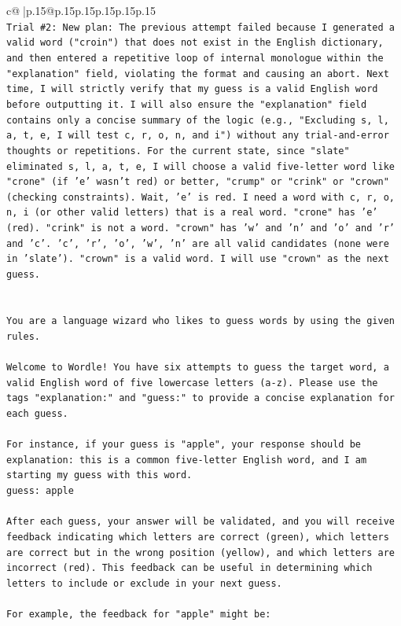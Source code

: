 \documentclass{article}
\begin{document}
{\begin{supertabular}{c@{$\;$}|p{.15\linewidth}@{}p{.15\linewidth}p{.15\linewidth}p{.15\linewidth}p{.15\linewidth}p{.15\linewidth}}
{{{\\ 
\texttt{Trial \#2: New plan: The previous attempt failed because I generated a valid word ("croin") that does not exist in the English dictionary, and then entered a repetitive loop of internal monologue within the "explanation" field, violating the format and causing an abort. Next time, I will strictly verify that my guess is a valid English word before outputting it. I will also ensure the "explanation" field contains only a concise summary of the logic (e.g., "Excluding s, l, a, t, e, I will test c, r, o, n, and i") without any trial{-}and{-}error thoughts or repetitions. For the current state, since "slate" eliminated s, l, a, t, e, I will choose a valid five{-}letter word like "crone" (if 'e' wasn't red) or better, "crump" or "crink" or "crown" (checking constraints). Wait, 'e' is red. I need a word with c, r, o, n, i (or other valid letters) that is a real word. "crone" has 'e' (red). "crink" is not a word. "crown" has 'w' and 'n' and 'o' and 'r' and 'c'. 'c', 'r', 'o', 'w', 'n' are all valid candidates (none were in 'slate'). "crown" is a valid word. I will use "crown" as the next guess.} \\
\\ 
\\ 
\texttt{You are a language wizard who likes to guess words by using the given rules.} \\
\\ 
\texttt{Welcome to Wordle! You have six attempts to guess the target word, a valid English word of five lowercase letters (a{-}z). Please use the tags "explanation:" and "guess:" to provide a concise explanation for each guess.} \\
\\ 
\texttt{For instance, if your guess is "apple", your response should be} \\
\texttt{explanation: this is a common five{-}letter English word, and I am starting my guess with this word.} \\
\texttt{guess: apple} \\
\\ 
\texttt{After each guess, your answer will be validated, and you will receive feedback indicating which letters are correct (green), which letters are correct but in the wrong position (yellow), and which letters are incorrect (red). This feedback can be useful in determining which letters to include or exclude in your next guess.} \\
\\ 
\texttt{For example, the feedback for "apple" might be:} \\
}}}
\end{supertabular}}
\end{document}
